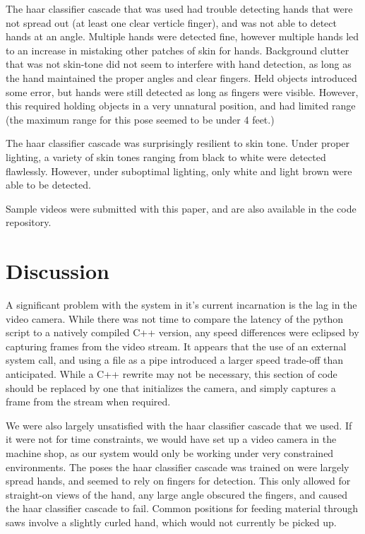 \documentclass[12pt]{article}
\begin{document}
The haar classifier cascade that was used had trouble detecting hands that were not spread out (at least one clear verticle finger), and was not able to detect hands at an angle. Multiple hands were detected fine, however multiple hands led to an increase in mistaking other patches of skin for hands. Background clutter that was not skin-tone did not seem to interfere with hand detection, as long as the hand maintained the proper angles and clear fingers. Held objects introduced some error, but hands were still detected as long as fingers were visible. However, this required holding objects in a very unnatural position, and had limited range (the maximum range for this pose seemed to be under 4 feet.)

The haar classifier cascade was surprisingly resilient to skin tone. Under proper lighting, a variety of skin tones ranging from black to white were detected flawlessly. However, under suboptimal lighting, only white and light brown were able to be detected.

Sample videos were submitted with this paper, and are also available in the code repository\cite{google-code}.

\section{Discussion}
A significant problem with the system in it's current incarnation is the lag in the video camera. While there was not time to compare the latency of the python script to a natively compiled C++ version, any speed differences were eclipsed by capturing frames from the video stream. It appears that the use of an external system call, and using a file as a pipe introduced a larger speed trade-off than anticipated. While a C++ rewrite may not be necessary, this section of code should be replaced by one that initializes the camera, and simply captures a frame from the stream when required.

We were also largely unsatisfied with the haar classifier cascade that we used. If it were not for time constraints, we would have set up a video camera in the machine shop, as our system would only be working under very constrained environments. The poses the haar classifier cascade was trained on were largely spread hands, and seemed to rely on fingers for detection. This only allowed for straight-on views of the hand, any large angle obscured the fingers, and caused the haar classifier cascade to fail. Common positions for feeding material through saws involve a slightly curled hand, which would not currently be picked up.
\end{document}
